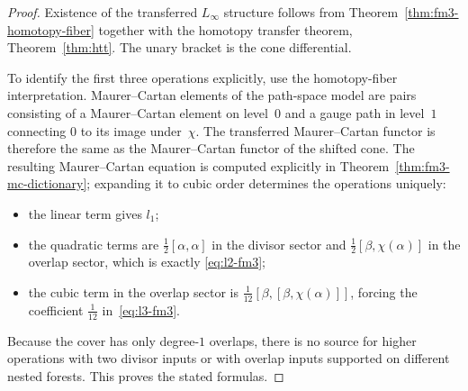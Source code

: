 \begin{proof}
Existence of the transferred $L_\infty$ structure follows from
Theorem~\ref{thm:fm3-homotopy-fiber} together with the homotopy transfer theorem,
Theorem~\ref{thm:htt}.  The unary bracket is the cone differential.

To identify the first three operations explicitly, use the homotopy-fiber
interpretation.  Maurer--Cartan elements of the path-space model are pairs
consisting of a Maurer--Cartan element on level~$0$ and a gauge path in level~$1$
connecting $0$ to its image under~$\chi$.  The transferred Maurer--Cartan functor
is therefore the same as the Maurer--Cartan functor of the shifted cone.  The
resulting Maurer--Cartan equation is computed explicitly in
Theorem~\ref{thm:fm3-mc-dictionary}; expanding it to cubic order determines the
operations uniquely:
\begin{itemize}
\item the linear term gives $l_1$;
\item the quadratic terms are $\tfrac12[\alpha,\alpha]$ in the divisor sector and
  $\tfrac12[\beta,\chi(\alpha)]$ in the overlap sector, which is exactly
  \eqref{eq:l2-fm3};
\item the cubic term in the overlap sector is
  $\tfrac1{12}[\beta,[\beta,\chi(\alpha)]]$, forcing the coefficient
  $\tfrac1{12}$ in~\eqref{eq:l3-fm3}.
\end{itemize}
Because the cover has only degree-$1$ overlaps, there is no source for higher
operations with two divisor inputs or with overlap inputs supported on different
nested forests.  This proves the stated formulas.
\end{proof}

